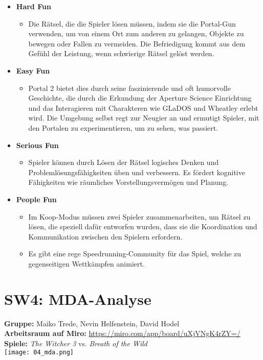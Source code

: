 \documentclass{article}
\begin{document}
\begin{itemize}
    \item \textbf{Hard Fun}
    \begin{itemize}
        \item Die Rätsel, die die Spieler lösen müssen, indem sie die Portal-Gun verwenden, um von einem Ort zum anderen zu gelangen,
         Objekte zu bewegen oder Fallen zu vermeiden. Die Befriedigung kommt aus dem Gefühl der Leistung, wenn schwierige Rätsel
         gelöst werden.
    \end{itemize}
    \item \textbf{Easy Fun}
    \begin{itemize}
        \item Portal 2 bietet dies durch seine faszinierende und oft humorvolle Geschichte, die durch die Erkundung der Aperture
        Science Einrichtung und das Interagieren mit Charakteren wie GLaDOS und Wheatley erlebt wird. Die Umgebung selbst regt zur
        Neugier an und ermutigt Spieler, mit den Portalen zu experimentieren, um zu sehen, was passiert.
    \end{itemize}
    \item \textbf{Serious Fun}
    \begin{itemize}
        \item Spieler können durch Lösen der Rätsel logisches Denken und Problemlösungsfähigkeiten üben und verbessern.
        Es fördert kognitive Fähigkeiten wie räumliches Vorstellungsvermögen und Planung.
    \end{itemize}
    \item \textbf{People Fun}
    \begin{itemize}
        \item Im Koop-Modus müssen zwei Spieler zusammenarbeiten, um Rätsel zu lösen, die speziell dafür entworfen wurden, dass sie
        die Koordination und Kommunikation zwischen den Spielern erfordern.
        \item Es gibt eine rege Speedrunning-Community für das Spiel, welche zu gegenseitigen Wettkämpfen animiert.
    \end{itemize}
\end{itemize}

\section{SW4: MDA-Analyse}

\textbf{Gruppe:} Maiko Trede, Nevin Helfenstein, David Hodel
\\
\textbf{Arbeitsraum auf Miro:} \url{https://miro.com/app/board/uXjVNgK4rZY=/}
\\
\textbf{Spiele:} \textit{The Witcher 3} vs. \textit{Breath of the Wild}
\\
\texttt{[image: 04\_mda.png]}
\end{document}
